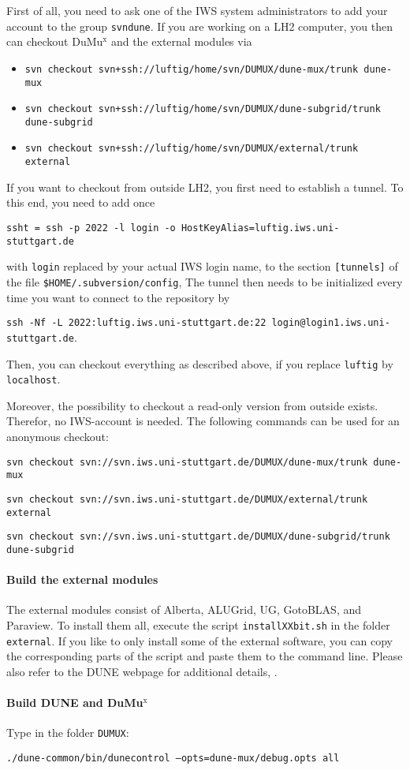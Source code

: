 First of all, you need to ask one of the IWS system administrators to 
add your account to the group \texttt{svndune}. 
If you are working on a LH2 computer, you then can checkout DuMu$^\text{x}$ 
and the external modules via 
\begin{itemize}
\item \texttt{svn checkout svn+ssh://luftig/home/svn/DUMUX/dune-mux/trunk dune-mux}
\item \texttt{svn checkout svn+ssh://luftig/home/svn/DUMUX/dune-subgrid/trunk dune-subgrid}
\item \texttt{svn checkout svn+ssh://luftig/home/svn/DUMUX/external/trunk external}
\end{itemize} 
If you want to checkout from outside LH2, you first need to establish a tunnel. 
To this end, you need to add once 
\begin{center}
\texttt{ssht = ssh -p 2022 -l login -o HostKeyAlias=luftig.iws.uni-stuttgart.de} 
\end{center}
with \texttt{login} replaced 
by your actual IWS login name, to the section \texttt{[tunnels]} of the 
file \texttt{\$HOME/.subversion/config}, 
The tunnel then needs to be initialized every time you want 
to connect to the repository by 
\begin{center}
\texttt{ssh -Nf -L 2022:luftig.iws.uni-stuttgart.de:22 login@login1.iws.uni-stuttgart.de}.
\end{center}
Then, you can checkout everything as described above, if you replace \texttt{luftig} 
by \texttt{localhost}. 

Moreover, the possibility to checkout a read-only version from outside exists. Therefor, no IWS-account is needed. The following commands can be used for an anonymous checkout:
\item \texttt{svn checkout svn://svn.iws.uni-stuttgart.de/DUMUX/dune-mux/trunk dune-mux}
\item \texttt{svn checkout svn://svn.iws.uni-stuttgart.de/DUMUX/external/trunk external}
\item \texttt{svn checkout svn://svn.iws.uni-stuttgart.de/DUMUX/dune-subgrid/trunk dune-subgrid}


\paragraph{Build the external modules} 
The external modules consist of Alberta, ALUGrid, UG, GotoBLAS, and Paraview. 
To install them all, execute the script \texttt{installXXbit.sh} in the folder \texttt{external}. 
If you like to only install some of the external software, you can copy the corresponding 
parts of the script and paste them to the command line. 
Please also refer to the DUNE webpage for additional details, \cite{DUNE-HP}. 

\paragraph{Build DUNE and DuMu$^\text{x}$}
Type in the folder \texttt{DUMUX}: 
\begin{center}
\texttt{./dune-common/bin/dunecontrol --opts=dune-mux/debug.opts all}
\end{center}

